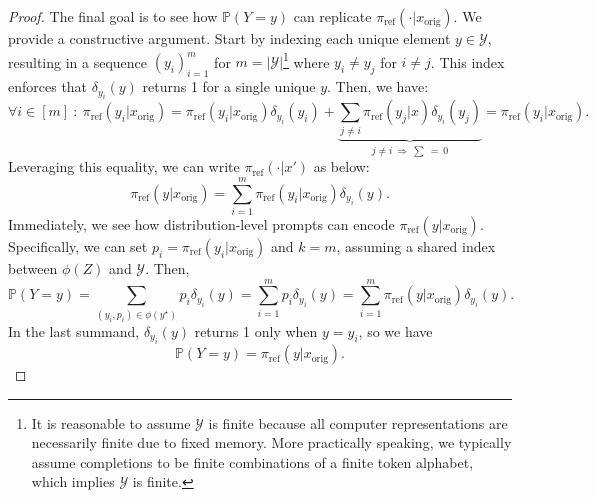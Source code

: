 \begin{proof}
The final goal is to see how $\mathbb{P}(Y = y)$ can replicate $\pi_\textrm{ref}(\cdot | x_\text{orig})$. We provide a constructive argument. Start by indexing each unique element $y \in \mathcal{Y}$, resulting in a sequence $(y_i)_{i=1}^m$ for $m = |\mathcal{Y}|$\footnote{It is reasonable to assume $\mathcal{Y}$ is finite because all computer representations are necessarily finite due to fixed memory. More practically speaking, we typically assume completions to be finite combinations of a finite token alphabet, which implies $\mathcal{Y}$ is finite.} where $y_i \neq y_j$ for $i \neq j$. This index enforces that $\delta_{y_i}(y)$ returns 1 for a single unique $y$. Then, we have:
\begin{equation}
    \forall i \in [m] \ : \ \pi_\text{ref}(y_i | x_\text{orig}) = \pi_\text{ref}(y_i | x_\text{orig}) \delta_{y_i}(y_i) + \underbrace{\sum_{j \neq i} \pi_\text{ref}(y_j | x) \delta_{y_i}(y_j)}_{j \neq i \ \Rightarrow \ \sum \ = \ 0} = \pi_\text{ref}(y_i | x_\text{orig}).
\end{equation}
Leveraging this equality, we can write $\pi_\text{ref}(\cdot | x')$ as below:
\begin{equation}
    \pi_\text{ref}(y | x_\text{orig}) = \sum_{i=1}^m \pi_\text{ref}(y_i | x_\text{orig}) \delta_{y_i}(y).
\end{equation}
Immediately, we see how distribution-level prompts can encode $\pi_\text{ref}(y | x_\text{orig})$. Specifically, we can set $p_i = \pi_\text{ref}(y_i | x_\text{orig})$ and $k=m$, assuming a shared index between $\phi(Z)$ and $\mathcal{Y}$. Then,
\begin{equation}
    \mathbb{P}(Y = y) = \sum_{(y_i,p_i) \in \phi(y^\star)}  p_i\delta_{y_i}(y) = \sum_{i=1}^m p_i \delta_{y_i}(y) = \sum_{i=1}^m \pi_\text{ref}(y | x_\text{orig})\delta_{y_i}(y).
\end{equation}
In the last summand, $\delta_{y_i}(y)$ returns 1 only when $y = y_i$, so we have
\begin{equation}
    \mathbb{P}(Y = y) = \pi_\text{ref}(y | x_\text{orig}).
\end{equation}
\end{proof}
